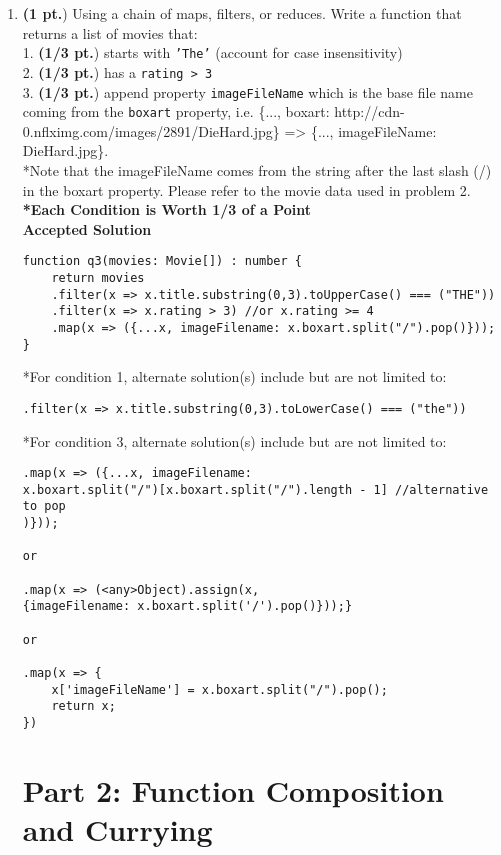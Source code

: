 \documentclass[12pt]{article}
\begin{document}
\begin{enumerate}
\newpage
\item \textbf{(1 pt.}) Using a chain of maps, filters, or reduces. Write a function that returns a list of movies that: \\
  1. \textbf{(1/3 pt.}) starts with \texttt{'The'} (account for case insensitivity) \\
  2. \textbf{(1/3 pt.}) has a \texttt{rating > 3} \\
  3. \textbf{(1/3 pt.}) append property \texttt{imageFileName} which is the base file name coming from the \texttt{boxart} property, i.e. \{..., boxart: http://cdn-0.nflximg.com/images/2891/DieHard.jpg\} => \{..., imageFileName: DieHard.jpg\}. \\
  *Note that the imageFileName comes from the string after the last slash (/) in the boxart property. 
  Please refer to the movie data used in problem 2. \\
  
\textbf{*Each Condition is Worth 1/3 of a Point} \\
\textbf{Accepted Solution}
\begin{lstlisting}[style=JavaScript]
function q3(movies: Movie[]) : number {
    return movies
    .filter(x => x.title.substring(0,3).toUpperCase() === ("THE"))
    .filter(x => x.rating > 3) //or x.rating >= 4
    .map(x => ({...x, imageFilename: x.boxart.split("/").pop()}));
}
\end{lstlisting}
*For condition 1, alternate solution(s) include but are not limited to:
\begin{lstlisting}[style=JavaScript]
.filter(x => x.title.substring(0,3).toLowerCase() === ("the"))
\end{lstlisting}
*For condition 3, alternate solution(s) include but are not limited to:
\begin{lstlisting}[style=JavaScript]
.map(x => ({...x, imageFilename: 
x.boxart.split("/")[x.boxart.split("/").length - 1] //alternative to pop
)}));

or

.map(x => (<any>Object).assign(x, 
{imageFilename: x.boxart.split('/').pop()}));} 

or

.map(x => {
    x['imageFileName'] = x.boxart.split("/").pop();
    return x;
})       
\end{lstlisting}

\newpage
\section{Part 2: Function Composition and Currying}


\end{enumerate}
\end{document}
